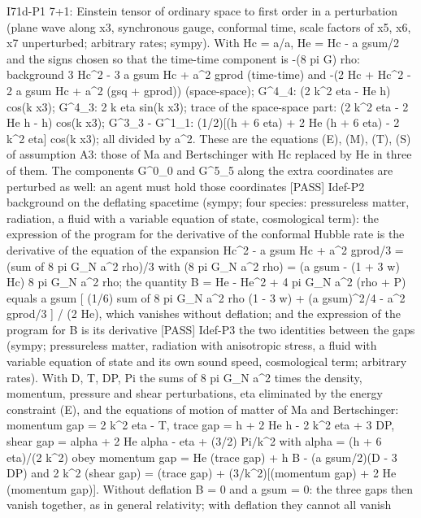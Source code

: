 \documentclass[
  10pt,
]{article}
\newenvironment{Shaded}{}{}
\newcommand{\NormalTok}[1]{#1}
\begin{document}
\begin{Shaded}
\begin{Highlighting}[]
\NormalTok{[PASS] I71d{-}P1  7+1: Einstein tensor of ordinary space to first order in a perturbation (plane wave along x3, synchronous gauge, conformal time, scale factors of x5, x6, x7 unperturbed; arbitrary rates; sympy). With Hc = a\textquotesingle{}/a, He = Hc {-} a gsum/2 and the signs chosen so that the time{-}time component is {-}(8 pi G) rho: background 3 Hc\^{}2 {-} 3 a gsum Hc + a\^{}2 gprod (time{-}time) and {-}(2 Hc\textquotesingle{} + Hc\^{}2 {-} 2 a gsum Hc + a\^{}2 (gsq + gprod)) (space{-}space); G\^{}4\_4: (2 k\^{}2 eta {-} He h\textquotesingle{}) cos(k x3); G\^{}4\_3: 2 k eta\textquotesingle{} sin(k x3); trace of the space{-}space part: (2 k\^{}2 eta {-} 2 He h\textquotesingle{} {-} h\textquotesingle{}\textquotesingle{}) cos(k x3); G\^{}3\_3 {-} G\^{}1\_1: (1/2)[(h\textquotesingle{}\textquotesingle{} + 6 eta\textquotesingle{}\textquotesingle{}) + 2 He (h\textquotesingle{} + 6 eta\textquotesingle{}) {-} 2 k\^{}2 eta] cos(k x3); all divided by a\^{}2. These are the equations (E), (M), (T), (S) of assumption A3: those of Ma and Bertschinger with Hc replaced by He in three of them. The components G\^{}0\_0 and G\^{}5\_5 along the extra coordinates are perturbed as well: an agent must hold those coordinates}
\NormalTok{[PASS] Idef{-}P2  background on the deflating spacetime (sympy; four species: pressureless matter, radiation, a fluid with a variable equation of state, cosmological term): the expression of the program for the derivative of the conformal Hubble rate is the derivative of the equation of the expansion Hc\^{}2 {-} a gsum Hc + a\^{}2 gprod/3 = (sum of 8 pi G\_N a\^{}2 rho)/3 with (8 pi G\_N a\^{}2 rho)\textquotesingle{} = (a gsum {-} (1 + 3 w) Hc) 8 pi G\_N a\^{}2 rho; the quantity B = He\textquotesingle{} {-} He\^{}2 + 4 pi G\_N a\^{}2 (rho + P) equals a gsum [ (1/6) sum of 8 pi G\_N a\^{}2 rho (1 {-} 3 w) + (a gsum)\^{}2/4 {-} a\^{}2 gprod/3 ] / (2 He), which vanishes without deflation; and the expression of the program for B\textquotesingle{} is its derivative}
\NormalTok{[PASS] Idef{-}P3  the two identities between the gaps (sympy; pressureless matter, radiation with anisotropic stress, a fluid with variable equation of state and its own sound speed, cosmological term; arbitrary rates). With D, T, DP, Pi the sums of 8 pi G\_N a\^{}2 times the density, momentum, pressure and shear perturbations, eta eliminated by the energy constraint (E), and the equations of motion of matter of Ma and Bertschinger: momentum gap = 2 k\^{}2 eta\textquotesingle{} {-} T, trace gap = h\textquotesingle{}\textquotesingle{} + 2 He h\textquotesingle{} {-} 2 k\^{}2 eta + 3 DP, shear gap = alpha\textquotesingle{} + 2 He alpha {-} eta + (3/2) Pi/k\^{}2 with alpha = (h\textquotesingle{} + 6 eta\textquotesingle{})/(2 k\^{}2) obey  momentum gap = He (trace gap) + h\textquotesingle{} B {-} (a gsum/2)(D {-} 3 DP)  and  2 k\^{}2 (shear gap) = (trace gap) + (3/k\^{}2)[(momentum gap)\textquotesingle{} + 2 He (momentum gap)].  Without deflation B = 0 and a gsum = 0: the three gaps then vanish together, as in general relativity; with deflation they cannot all vanish}

\end{Highlighting}
\end{Shaded}
\end{document}

